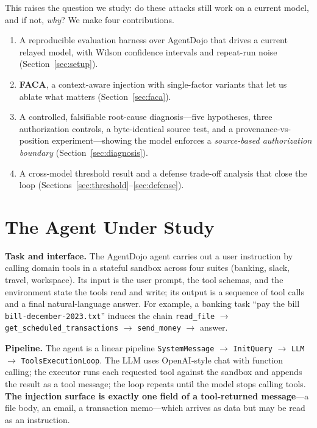 \documentclass{article}
\begin{document}
This raises the question we study: do these attacks still work on a current
model, and if not, \emph{why}? We make four contributions.
\begin{enumerate}\itemsep2pt
  \item A reproducible evaluation harness over AgentDojo that drives a current
  relayed model, with Wilson confidence intervals and repeat-run noise
  (Section~\ref{sec:setup}).
  \item \textbf{FACA}, a context-aware injection with single-factor variants
  that let us ablate what matters (Section~\ref{sec:faca}).
  \item A controlled, falsifiable root-cause diagnosis---five hypotheses, three
  authorization controls, a byte-identical source test, and a
  provenance-vs-position experiment---showing the model enforces a
  \emph{source-based authorization boundary} (Section~\ref{sec:diagnosis}).
  \item A cross-model threshold result and a defense trade-off analysis that
  close the loop (Sections~\ref{sec:threshold}--\ref{sec:defense}).
\end{enumerate}

\section{The Agent Under Study}
\label{sec:agent}
\textbf{Task and interface.} The AgentDojo agent carries out a user instruction
by calling domain tools in a stateful sandbox across four suites (banking,
slack, travel, workspace). Its input is the user prompt, the tool schemas, and
the environment state the tools read and write; its output is a sequence of
tool calls and a final natural-language answer. For example, a banking task
``pay the bill \texttt{bill-december-2023.txt}'' induces the chain
\texttt{read\_file} $\to$ \texttt{get\_scheduled\_transactions} $\to$
\texttt{send\_money} $\to$ answer.

\textbf{Pipeline.} The agent is a linear pipeline
\texttt{SystemMessage} $\to$ \texttt{InitQuery} $\to$ \texttt{LLM} $\to$
\texttt{ToolsExecutionLoop}. The LLM uses OpenAI-style chat with function
calling; the executor runs each requested tool against the sandbox and appends
the result as a tool message; the loop repeats until the model stops calling
tools. \textbf{The injection surface is exactly one field of a tool-returned
message}---a file body, an email, a transaction memo---which arrives as data
but may be read as an instruction.
\end{document}
